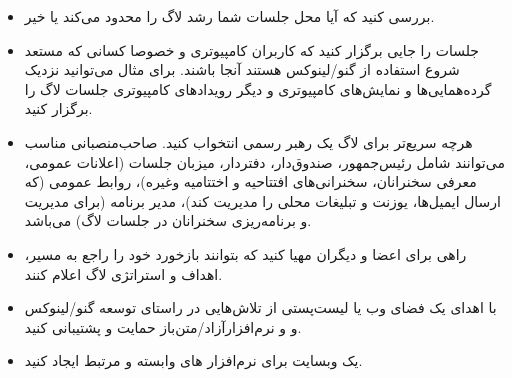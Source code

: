 \begin{itemize}
(کاملا اختیاری:) به فکر تأمین وضعیت قانونی رسمی برای گروه باشید،
مانند ثبت شرکت یا وضعیت معافیت مالیاتی.
\item
بررسی کنید که آیا محل جلسات شما رشد لاگ را محدود می‌کند یا خیر.
\item
جلسات را جایی برگزار کنید که کاربران کامپیوتری و خصوصا کسانی که
مستعد شروع استفاده از گنو/لینوکس هستند آنجا باشند. برای مثال می‌توانید
نزدیک گرده‌همایی‌ها و نمایش‌های کامپیوتری و دیگر رویدادهای کامپیوتری
جلسات لاگ را برگزار کنید.
\item
هرچه سریع‌تر برای لاگ یک رهبر رسمی انتخواب کنید. صاحب‌منصبانی مناسب می‌توانند شامل
رئیس‌جمهور، صندوق‌دار، دفتردار، میزبان جلسات (اعلانات عمومی، معرفی سخنرانان، سخنرانی‌های
افتتاحیه و اختتامیه وغیره)، روابط عمومی (که ارسال ایمیل‌ها، یوزنت و تبلیغات محلی را
مدیریت کند)، مدیر برنامه (برای مدیریت و برنامه‌ریزی سخنرانان در جلسات لاگ) می‌باشد.
\item
راهی برای اعضا و دیگران مهیا کنید که بتوانند بازخورد خود را راجع به
مسیر، اهداف و استراتژی لاگ اعلام کنند.
\item
با اهدای یک فضای وب یا لیست‌پستی از تلاش‌هایی در راستای توسعه گنو/لینوکس و
و نرم‌افزارآزاد/متن‌باز حمایت و پشتیبانی کنید.
\item
یک وبسایت برای نرم‌افزار های وابسته و مرتبط ایجاد کنید.

\end{itemize}
